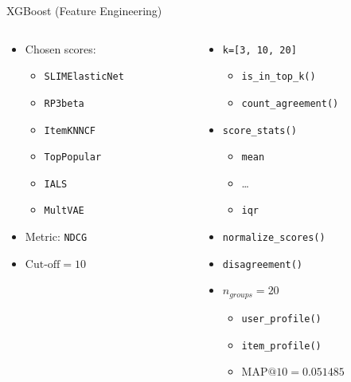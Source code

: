 \documentclass{beamer}
\begin{document}
\begin{frame}{XGBoost (Feature Engineering)}
  \begin{columns}[t]
    \begin{column}{0.5\textwidth}
      \begin{itemize}
        \item Chosen scores:
        \begin{itemize}
          \item \texttt{SLIMElasticNet}
          \item \texttt{RP3beta}
          \item \texttt{ItemKNNCF}
          \item \texttt{TopPopular}
          \item \texttt{IALS}
          \item \texttt{MultVAE}
        \end{itemize}
        \item Metric: \texttt{NDCG}
        \item $\text{Cut-off}=10$
      \end{itemize}
    \end{column}

    \begin{column}{0.5\textwidth}
      \begin{itemize}
        \item \lstinline{k=[3, 10, 20]}
        \begin{itemize}
          \item \texttt{is\_in\_top\_k()}
          \item \texttt{count\_agreement()}
        \end{itemize}
        \item \texttt{score\_stats()}
        \begin{itemize}
          \item \texttt{mean}
          \item \ldots
          \item \texttt{iqr}
        \end{itemize}
        \item \texttt{normalize\_scores()}
        \item \texttt{disagreement()}
        \item $n_{groups}=20$
        \begin{itemize}
          \item \texttt{user\_profile()}
          \item \texttt{item\_profile()}
          \item $\text{MAP@}10=0.051485$
        \end{itemize}
      \end{itemize}
    \end{column}
  \end{columns}
\end{frame}
\end{document}
